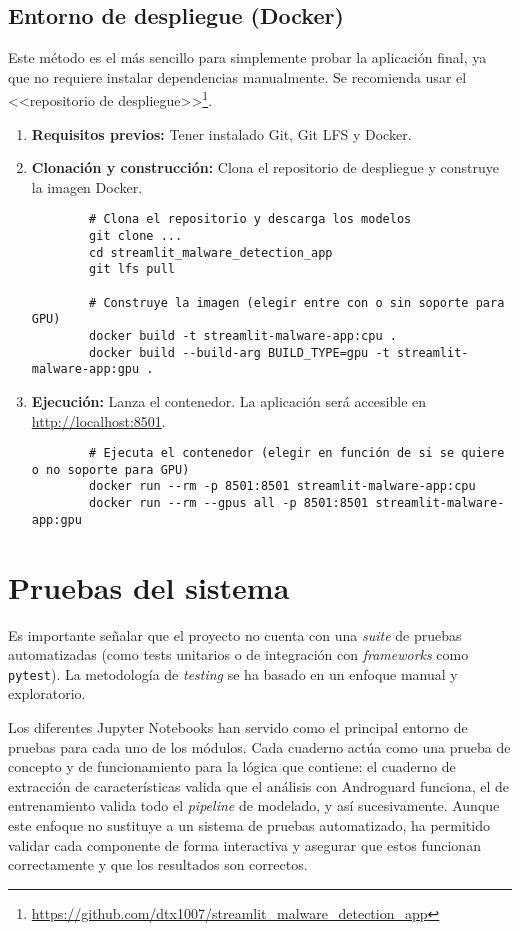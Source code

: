 \subsection{Entorno de despliegue (Docker)}
\label{despliegue_docker}
Este método es el más sencillo para simplemente probar la aplicación final, ya que no requiere instalar dependencias manualmente. Se recomienda usar el <<repositorio de despliegue>>\footnote{\url{https://github.com/dtx1007/streamlit_malware_detection_app}}.

\begin{enumerate}
	\item \textbf{Requisitos previos:} Tener instalado Git, Git LFS y Docker.
	
	\item \textbf{Clonación y construcción:} Clona el repositorio de despliegue y construye la imagen Docker.
	\begin{verbatim}
		# Clona el repositorio y descarga los modelos
		git clone ...
		cd streamlit_malware_detection_app
		git lfs pull
		
		# Construye la imagen (elegir entre con o sin soporte para GPU)
		docker build -t streamlit-malware-app:cpu .
		docker build --build-arg BUILD_TYPE=gpu -t streamlit-malware-app:gpu .
	\end{verbatim}
	
	\item \textbf{Ejecución:} Lanza el contenedor. La aplicación será accesible en \url{http://localhost:8501}.
	\begin{verbatim}
		# Ejecuta el contenedor (elegir en función de si se quiere o no soporte para GPU)
		docker run --rm -p 8501:8501 streamlit-malware-app:cpu
		docker run --rm --gpus all -p 8501:8501 streamlit-malware-app:gpu
	\end{verbatim}
\end{enumerate}

\section{Pruebas del sistema}
Es importante señalar que el proyecto no cuenta con una \textit{suite} de pruebas automatizadas (como tests unitarios o de integración con \textit{frameworks} como \texttt{pytest}). La metodología de \textit{testing} se ha basado en un enfoque manual y exploratorio.

Los diferentes Jupyter Notebooks han servido como el principal entorno de pruebas para cada uno de los módulos. Cada cuaderno actúa como una prueba de concepto y de funcionamiento para la lógica que contiene: el cuaderno de extracción de características valida que el análisis con Androguard funciona, el de entrenamiento valida todo el \textit{pipeline} de modelado, y así sucesivamente. Aunque este enfoque no sustituye a un sistema de pruebas automatizado, ha permitido validar cada componente de forma interactiva y asegurar que estos funcionan correctamente y que los resultados son correctos.
